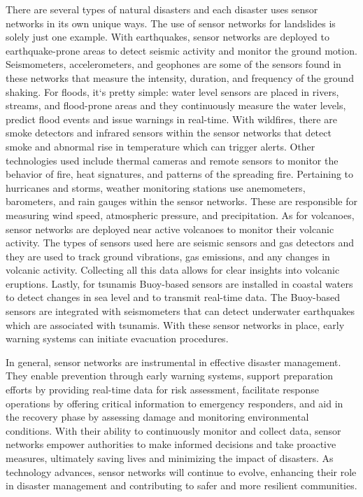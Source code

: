 \documentclass[conference]{IEEEtran}
\begin{document}
There are several types of natural disasters and each disaster uses sensor networks in its own unique ways.
The use of sensor networks for landslides is solely just one example. With earthquakes, sensor networks are
deployed to earthquake-prone areas to detect seismic activity and monitor the ground motion. Seismometers,
accelerometers, and geophones are some of the sensors found in these networks that measure the intensity,
duration, and frequency of the ground shaking. For floods, it`s pretty simple: water level sensors are placed
in rivers, streams, and flood-prone areas and they continuously measure the water levels, predict flood events
and issue warnings in real-time. With wildfires, there are smoke detectors and infrared sensors within the
sensor networks that detect smoke and abnormal rise in temperature which can trigger alerts. Other technologies
used include thermal cameras and remote sensors to monitor the behavior of fire, heat signatures, and patterns
of the spreading fire. Pertaining to hurricanes and storms, weather monitoring stations use anemometers,
barometers, and rain gauges within the sensor networks. These are responsible for measuring wind speed,
atmospheric pressure, and precipitation. As for volcanoes, sensor networks are deployed near active volcanoes
to monitor their volcanic activity. The types of sensors used here are seismic sensors and gas detectors
and they are used to track ground vibrations, gas emissions, and any changes in volcanic activity. Collecting
all this data allows for clear insights into volcanic eruptions. Lastly, for tsunamis Buoy-based sensors
are installed in coastal waters to detect changes in sea level and to transmit real-time data. The Buoy-based
sensors are integrated with seismometers that can detect underwater earthquakes which are associated with tsunamis.
With these sensor networks in place, early warning systems can initiate evacuation procedures.\par

In general, sensor networks are instrumental in effective disaster management. They enable prevention through 
early warning systems, support preparation efforts by providing real-time data for risk assessment, facilitate 
response operations by offering critical information to emergency responders, and aid in the recovery phase by 
assessing damage and monitoring environmental conditions. With their ability to continuously monitor and collect 
data, sensor networks empower authorities to make informed decisions and take proactive measures, ultimately 
saving lives and minimizing the impact of disasters. As technology advances, sensor networks will continue to 
evolve, enhancing their role in disaster management and contributing to safer and more resilient communities.\par
\end{document}
